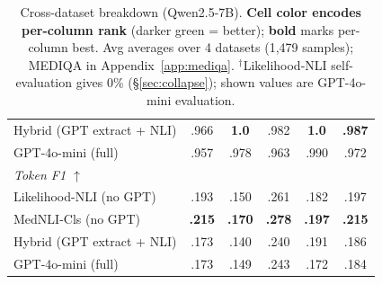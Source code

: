 \documentclass[11pt]{article}
\begin{document}
\begin{table}[t]
\begin{tabular}{@{}l cccc|c@{}}
Hybrid (GPT extract + NLI)
  & \cellcolor{g3}.966 & \cellcolor{g4}\textbf{1.0} & \cellcolor{g3}.982 & \cellcolor{g4}\textbf{1.0} & \cellcolor{g4}\textbf{.987} \\
GPT-4o-mini (full)
  & \cellcolor{g2}.957 & \cellcolor{g2}.978 & \cellcolor{g2}.963 & \cellcolor{g3}.990 & \cellcolor{g2}.972 \\
\midrule
\multicolumn{6}{l}{\textit{Token F1 $\uparrow$}} \\
Likelihood-NLI (no GPT)
  & \cellcolor{g3}.193 & \cellcolor{g3}.150 & \cellcolor{g3}.261 & \cellcolor{g2}.182 & \cellcolor{g3}.197 \\
MedNLI-Cls (no GPT)
  & \cellcolor{g4}\textbf{.215} & \cellcolor{g4}\textbf{.170} & \cellcolor{g4}\textbf{.278} & \cellcolor{g4}\textbf{.197} & \cellcolor{g4}\textbf{.215} \\
Hybrid (GPT extract + NLI)
  & \cellcolor{g1}.173 & \cellcolor{g1}.140 & \cellcolor{g1}.240 & \cellcolor{g3}.191 & \cellcolor{g2}.186 \\
GPT-4o-mini (full)
  & \cellcolor{g1}.173 & \cellcolor{g2}.149 & \cellcolor{g2}.243 & \cellcolor{g1}.172 & \cellcolor{g1}.184 \\
\bottomrule
\end{tabular}
\caption{Cross-dataset breakdown (Qwen2.5-7B). 
\textbf{Cell color encodes per-column rank} 
(darker green = better); \textbf{bold} marks 
per-column best. Avg averages over 4 datasets 
(1{,}479 samples); MEDIQA in 
Appendix~\ref{app:mediqa}.
$^{\dagger}$Likelihood-NLI self-evaluation gives 
0\% (\S\ref{sec:collapse}); shown values are 
GPT-4o-mini evaluation.}
\label{tab:cross_dataset_full}
\end{table}
\end{document}
